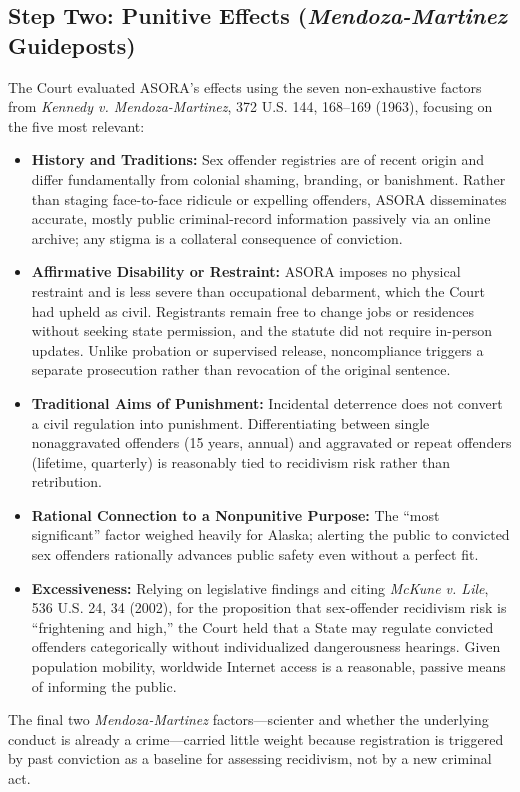 \documentclass[12pt]{article}
\begin{document}
\subsection{Step Two: Punitive Effects (\textit{Mendoza-Martinez} Guideposts)}
The Court evaluated ASORA's effects using the seven non-exhaustive factors from \textit{Kennedy v. Mendoza-Martinez}, 372 U.S. 144, 168--169 (1963), focusing on the five most relevant:
\begin{itemize}
  \item \textbf{History and Traditions:} Sex offender registries are of recent origin and differ fundamentally from colonial shaming, branding, or banishment. Rather than staging face-to-face ridicule or expelling offenders, ASORA disseminates accurate, mostly public criminal-record information passively via an online archive; any stigma is a collateral consequence of conviction.
  \item \textbf{Affirmative Disability or Restraint:} ASORA imposes no physical restraint and is less severe than occupational debarment, which the Court had upheld as civil. Registrants remain free to change jobs or residences without seeking state permission, and the statute did not require in-person updates. Unlike probation or supervised release, noncompliance triggers a separate prosecution rather than revocation of the original sentence.
  \item \textbf{Traditional Aims of Punishment:} Incidental deterrence does not convert a civil regulation into punishment. Differentiating between single nonaggravated offenders (15 years, annual) and aggravated or repeat offenders (lifetime, quarterly) is reasonably tied to recidivism risk rather than retribution.
  \item \textbf{Rational Connection to a Nonpunitive Purpose:} The ``most significant'' factor weighed heavily for Alaska; alerting the public to convicted sex offenders rationally advances public safety even without a perfect fit.
  \item \textbf{Excessiveness:} Relying on legislative findings and citing \textit{McKune v. Lile}, 536 U.S. 24, 34 (2002), for the proposition that sex-offender recidivism risk is ``frightening and high,'' the Court held that a State may regulate convicted offenders categorically without individualized dangerousness hearings. Given population mobility, worldwide Internet access is a reasonable, passive means of informing the public.
\end{itemize}
The final two \textit{Mendoza-Martinez} factors---scienter and whether the underlying conduct is already a crime---carried little weight because registration is triggered by past conviction as a baseline for assessing recidivism, not by a new criminal act.
\end{document}
